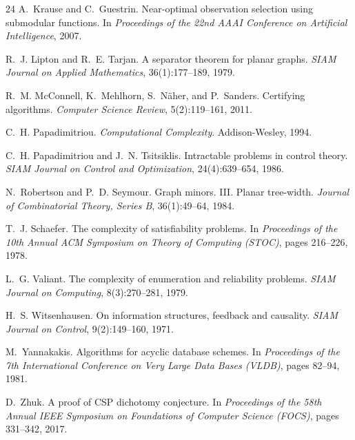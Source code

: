 \documentclass[11pt]{article}
\theoremstyle{plain}
\theoremstyle{definition}
\theoremstyle{remark}
\begin{document}
\begin{thebibliography}{24}
 A.~Krause and C.~Guestrin. Near-optimal
observation selection using submodular functions. In \emph{Proceedings of
the 22nd AAAI Conference on Artificial Intelligence}, 2007.

 R.~J. Lipton and R.~E. Tarjan. A separator theorem
for planar graphs. \emph{SIAM Journal on Applied Mathematics},
36(1):177--189, 1979.

 R.~M. McConnell, K.~Mehlhorn, S.~N\"aher, and P.~Sanders.
Certifying algorithms. \emph{Computer Science Review}, 5(2):119--161, 2011.

 C.~H. Papadimitriou. \emph{Computational
Complexity}. Addison-Wesley, 1994.

 C.~H. Papadimitriou and J.~N. Tsitsiklis.
Intractable problems in control theory. \emph{SIAM Journal on Control and
Optimization}, 24(4):639--654, 1986.

 N.~Robertson and P.~D. Seymour.
Graph minors. III. Planar tree-width. \emph{Journal of Combinatorial Theory,
Series B}, 36(1):49--64, 1984.

 T.~J. Schaefer. The complexity of satisfiability
problems. In \emph{Proceedings of the 10th Annual ACM Symposium on Theory of
Computing (STOC)}, pages 216--226, 1978.

 L.~G. Valiant. The complexity of enumeration and
reliability problems. \emph{SIAM Journal on Computing}, 8(3):270--281, 1979.

 H.~S. Witsenhausen. On information structures,
feedback and causality. \emph{SIAM Journal on Control}, 9(2):149--160, 1971.

 M.~Yannakakis. Algorithms for acyclic database
schemes. In \emph{Proceedings of the 7th International Conference on Very
Large Data Bases (VLDB)}, pages 82--94, 1981.

 D.~Zhuk. A proof of CSP dichotomy conjecture. In
\emph{Proceedings of the 58th Annual IEEE Symposium on Foundations of
Computer Science (FOCS)}, pages 331--342, 2017.

\end{thebibliography}
\end{document}
